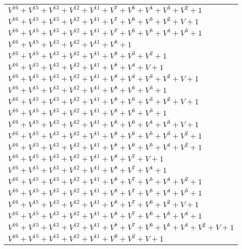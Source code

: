 \documentclass[12pt]{article}
\begin{document}
\begin{adjustwidth}{-4cm}{}
\begin{center}
\begin{longtable}{|l|}
$V^{16}  +V^{15}  +V^{13}  +V^{12}  +V^{11}  +V^{7}  +V^{6}  +V^{4}  +V^{3}  +V^{2}  + 1$ \\
$V^{16}  +V^{15}  +V^{13}  +V^{12}  +V^{11}  +V^{7}  +V^{6}  +V^{5}  +V^{2}  + V + 1$ \\
$V^{16}  +V^{15}  +V^{13}  +V^{12}  +V^{11}  +V^{7}  +V^{6}  +V^{5}  +V^{4}  +V^{3}  + 1$ \\
$V^{16}  +V^{15}  +V^{13}  +V^{12}  +V^{11}  +V^{8}  + 1$ \\
$V^{16}  +V^{15}  +V^{13}  +V^{12}  +V^{11}  +V^{8}  +V^{3}  +V^{2}  + 1$ \\
$V^{16}  +V^{15}  +V^{13}  +V^{12}  +V^{11}  +V^{8}  +V^{4}  + V + 1$ \\
$V^{16}  +V^{15}  +V^{13}  +V^{12}  +V^{11}  +V^{8}  +V^{4}  +V^{3}  +V^{2}  + V + 1$ \\
$V^{16}  +V^{15}  +V^{13}  +V^{12}  +V^{11}  +V^{8}  +V^{5}  +V^{3}  + 1$ \\
$V^{16}  +V^{15}  +V^{13}  +V^{12}  +V^{11}  +V^{8}  +V^{5}  +V^{3}  +V^{2}  + V + 1$ \\
$V^{16}  +V^{15}  +V^{13}  +V^{12}  +V^{11}  +V^{8}  +V^{6}  +V^{3}  + 1$ \\
$V^{16}  +V^{15}  +V^{13}  +V^{12}  +V^{11}  +V^{8}  +V^{6}  +V^{4}  +V^{3}  + V + 1$ \\
$V^{16}  +V^{15}  +V^{13}  +V^{12}  +V^{11}  +V^{8}  +V^{6}  +V^{5}  +V^{3}  +V^{2}  + 1$ \\
$V^{16}  +V^{15}  +V^{13}  +V^{12}  +V^{11}  +V^{8}  +V^{6}  +V^{5}  +V^{4}  +V^{2}  + 1$ \\
$V^{16}  +V^{15}  +V^{13}  +V^{12}  +V^{11}  +V^{8}  +V^{7}  + V + 1$ \\
$V^{16}  +V^{15}  +V^{13}  +V^{12}  +V^{11}  +V^{8}  +V^{7}  +V^{4}  + 1$ \\
$V^{16}  +V^{15}  +V^{13}  +V^{12}  +V^{11}  +V^{8}  +V^{7}  +V^{5}  +V^{4}  +V^{2}  + 1$ \\
$V^{16}  +V^{15}  +V^{13}  +V^{12}  +V^{11}  +V^{8}  +V^{7}  +V^{5}  +V^{4}  +V^{3}  + 1$ \\
$V^{16}  +V^{15}  +V^{13}  +V^{12}  +V^{11}  +V^{8}  +V^{7}  +V^{6}  +V^{2}  + V + 1$ \\
$V^{16}  +V^{15}  +V^{13}  +V^{12}  +V^{11}  +V^{8}  +V^{7}  +V^{6}  +V^{5}  +V^{4}  + 1$ \\
$V^{16}  +V^{15}  +V^{13}  +V^{12}  +V^{11}  +V^{8}  +V^{7}  +V^{6}  +V^{5}  +V^{4}  +V^{2}  + V + 1$ \\
$V^{16}  +V^{15}  +V^{13}  +V^{12}  +V^{11}  +V^{9}  +V^{2}  + V + 1$ \\

\end{longtable}
\end{center}
\end{adjustwidth}
\end{document}
